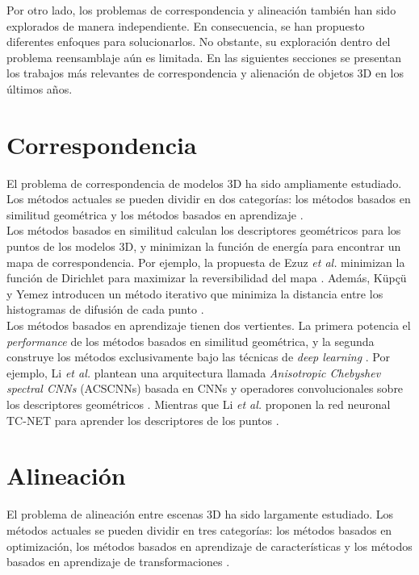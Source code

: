 \hfill \break

Por otro lado, los problemas de correspondencia y alineación también han sido explorados de manera independiente. En consecuencia, se han propuesto diferentes enfoques para solucionarlos. No obstante, su exploración dentro del problema reensamblaje aún es limitada. En las siguientes secciones se presentan los trabajos más relevantes de correspondencia y alienación de objetos 3D en los últimos años.

\section{Correspondencia}
El problema de correspondencia de modelos 3D ha sido ampliamente estudiado. Los métodos actuales se pueden dividir en dos categorías: los métodos basados en similitud geométrica y los métodos basados en aprendizaje \cite{18}. \\

Los métodos basados en similitud calculan los descriptores geométricos para los puntos de los modelos 3D, y minimizan la función de energía para encontrar un mapa de correspondencia. Por ejemplo, la propuesta de Ezuz \textit{et al.} minimizan la función de Dirichlet para maximizar la reversibilidad del mapa \cite{f5}. Además, Küpçü y Yemez introducen un método iterativo que minimiza la distancia entre los histogramas de difusión de cada punto \cite{f6}. \\

Los métodos basados en aprendizaje tienen dos vertientes. La primera potencia el \textit{performance} de los métodos basados en similitud geométrica, y la segunda construye los métodos exclusivamente bajo las técnicas de \textit{deep learning} \cite{18}. Por ejemplo, Li \textit{et al.} plantean una arquitectura llamada \textit{Anisotropic Chebyshev spectral CNNs} (ACSCNNs) basada en CNNs y operadores convolucionales sobre los descriptores geométricos \cite{f3}. Mientras que Li \textit{et al.} proponen la red neuronal TC-NET para aprender los descriptores de los puntos \cite{f4}.

\section{Alineación}
El problema de alineación entre escenas 3D ha sido largamente estudiado. Los métodos actuales se pueden dividir en tres categorías: los métodos basados en optimización, los métodos basados en aprendizaje de características y los métodos basados en aprendizaje de transformaciones \cite{9}. \\

